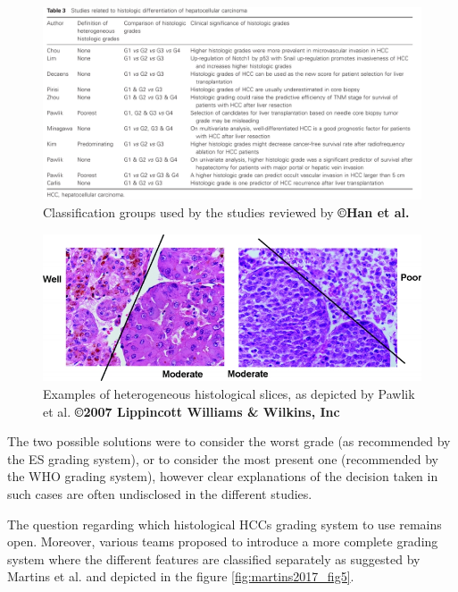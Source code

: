 \begin{figure}[th!]
\centering
\includegraphics[width=0.95\linewidth]{images/image9}
\caption{Classification groups used by the studies reviewed by \textbf{©Han et al.} \cite{Han2013}}
\label{fig:han2013_table3}
\end{figure}


\begin{figure}[th!]
\centering
\includegraphics[width=0.7\linewidth]{images/pawlik_fig4}
\caption{Examples of heterogeneous histological slices, as depicted by Pawlik et al. \cite{Pawlik2007} \textbf{©2007 Lippincott Williams \& Wilkins, Inc}}
\label{fig:pawlik_fig4}
\end{figure}


The two possible solutions were to consider the worst grade (as
recommended by the ES grading system), or to consider the most present
one (recommended by the WHO grading system), however clear explanations
of the decision taken in such cases are often undisclosed in the
different studies.

The question regarding which histological HCCs grading system to use
remains open. Moreover, various teams proposed to introduce a more
complete grading system where the different features are classified
separately as suggested by Martins et al. and depicted in the
figure \ref{fig:martins2017_fig5}.

